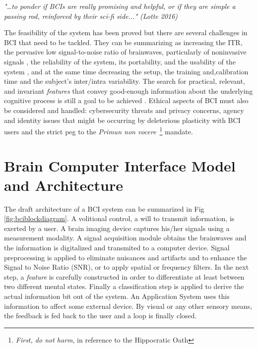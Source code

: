 \textit{"…to ponder if BCIs are really promising and helpful, or if they are simple a passing rod, reinforced by their sci-fi side..." (Lotte 2016)\cite{Lotte2016}}

\vspace{10px}

The feasibility of the system has been proved but there are several challenges in BCI that need to be tackled. They can be summarizing as 
increasing the ITR, the pervasive low signal-to-noise ratio of brainwaves, particularly of noninvasive signals \cite{Lotte2018}, the reliability of the system, its portability, and the usability of the system \cite{Wang2018}, and at the same time decreasing the setup, the training and,calibration time and the subject's inter/intra variability. The search for practical, relevant, and invariant \textit{features} that convey good-enough information about the underlying cognitive process is still a goal to be achieved \cite{Perdikis2014}.  Ethical aspects of BCI \cite{Yuste2017} must also be considered and handled: cybersecurity threats and privacy concerns,  agency and identity issues that might be occurring by deleterious plasticity with BCI users and the strict peg to the \textit{Primun non vocere}~\footnote{\textit{First, do not harm}, in reference to the Hippocratic Oath} mandate.


\section{Brain Computer Interface Model and Architecture}

The draft architecture of a BCI system can be summarized in Fig \ref{fig:bciblockdiagram}.  A volitional control, a will to transmit information, is exerted by a user. A brain imaging device captures his/her signals using a measurement modality.  A signal acquisition module obtains the brainwaves and the information is digitalized and transmited to a computer device.  Signal preprocessing is applied to eliminate nuisances and artifacts and to enhance the Signal to Noise Ratio (SNR), or to apply spatial or frequency filters.  In the next step, a \textit{feature} is carefully constructed in order to differentiate at least between two different mental states.  Finally a classification step is applied to derive the actual information bit out of the system.   An Application System uses this information to affect some external device.  By visual or any other sensory means, the feedback is fed back to the user and a loop is finally closed.

